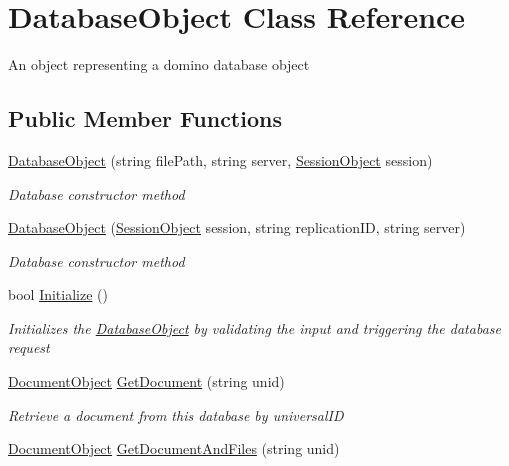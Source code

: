 \hypertarget{class_database_object}{}\section{Database\+Object Class Reference}
\label{class_database_object}


An object representing a domino database object  


\subsection*{Public Member Functions}
\begin{DoxyCompactItemize}
\item 
\mbox{\hyperlink{class_database_object_ab16b4327b02ffedcd1b003cea9d949a1}{Database\+Object}} (string file\+Path, string server, \mbox{\hyperlink{class_session_object}{Session\+Object}} session)
\begin{DoxyCompactList}\small\item\em Database constructor method \end{DoxyCompactList}\item 
\mbox{\hyperlink{class_database_object_a75d3e8a876c6899bd01b866e35475ed2}{Database\+Object}} (\mbox{\hyperlink{class_session_object}{Session\+Object}} session, string replication\+ID, string server)
\begin{DoxyCompactList}\small\item\em Database constructor method \end{DoxyCompactList}\item 
bool \mbox{\hyperlink{class_database_object_a7de43a21bd287deec537cffec343f41d}{Initialize}} ()
\begin{DoxyCompactList}\small\item\em Initializes the \mbox{\hyperlink{class_database_object}{Database\+Object}} by validating the input and triggering the database request \end{DoxyCompactList}\item 
\mbox{\hyperlink{class_document_object}{Document\+Object}} \mbox{\hyperlink{class_database_object_a9435cc20fe3a92747e509011b7726aff}{Get\+Document}} (string unid)
\begin{DoxyCompactList}\small\item\em Retrieve a document from this database by universal\+ID \end{DoxyCompactList}\item 
\mbox{\hyperlink{class_document_object}{Document\+Object}} \mbox{\hyperlink{class_database_object_a9be31ba852e56a107e93f7d925f8a0c3}{Get\+Document\+And\+Files}} (string unid)

\end{DoxyCompactItemize}
